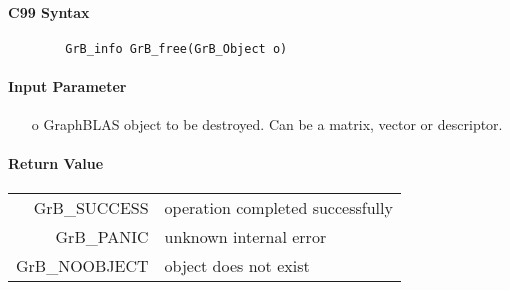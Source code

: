\paragraph{C99 Syntax}

\begin{verbatim}
        GrB_info GrB_free(GrB_Object o)
\end{verbatim}


\paragraph{Input Parameter}

\begin{itemize}
	\item[{\sf o}] GraphBLAS object to be destroyed. Can be a matrix, vector or descriptor.
\end{itemize}

\paragraph{Return Value}

\begin{tabular}{rl}
{\sf GrB\_SUCCESS}	& operation completed successfully \\
{\sf GrB\_PANIC}	& unknown internal error \\
{\sf GrB\_NOOBJECT}	& object does not exist \\
\end{tabular}
